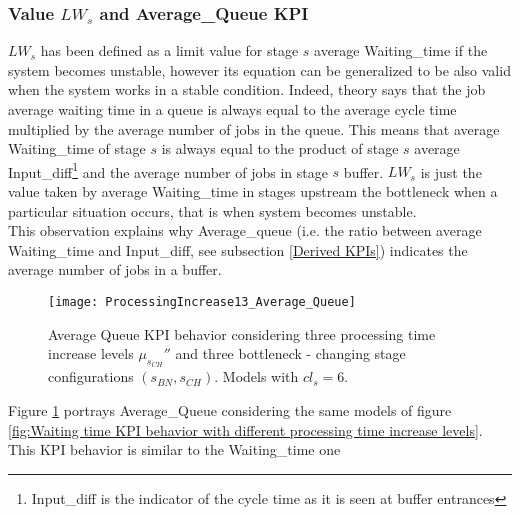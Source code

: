 \subsubsection{Value $LW_s$ and Average\_Queue KPI}
$LW_s$ has been defined as a limit value for stage $s$ average Waiting\_time if the system becomes unstable, however its equation can be generalized to be also valid when the system works in a stable condition. Indeed, theory says that the job average waiting time in a queue is always equal to the average cycle time multiplied by the average number of jobs in the queue. This means that average Waiting\_time of stage $s$ is always equal to the product of stage $s$ average Input\_diff\footnote{Input\_diff is the indicator of the cycle time as it is seen at buffer entrances} and the average number of jobs in stage $s$ buffer. $LW_s$ is just the value taken by average Waiting\_time in stages upstream the bottleneck when a particular situation occurs, that is when system becomes unstable. \\
This observation explains why Average\_queue (i.e. the ratio between average Waiting\_time and Input\_diff, see subsection \ref{Derived KPIs}) indicates the average number of jobs in a buffer.
\begin{figure}[h] 
\centering
\texttt{[image: ProcessingIncrease13\_Average\_Queue]}
\caption[Average Queue KPI behavior with different processing time increase levels]{Average Queue KPI behavior considering three processing time increase levels $\mu_{s_{CH}}''$ and three bottleneck - changing stage configurations $(s_{BN},s_{CH})$. Models with $cl_s=6$.}
\label{fig:Average Queue KPI behavior with different processing time increase levels}
\end{figure}
Figure \ref{fig:Average Queue KPI behavior with different processing time increase levels} portrays Average\_Queue considering the same models of figure \ref{fig:Waiting time KPI behavior with different processing time increase levels}. This KPI behavior is similar to the Waiting\_time one 
